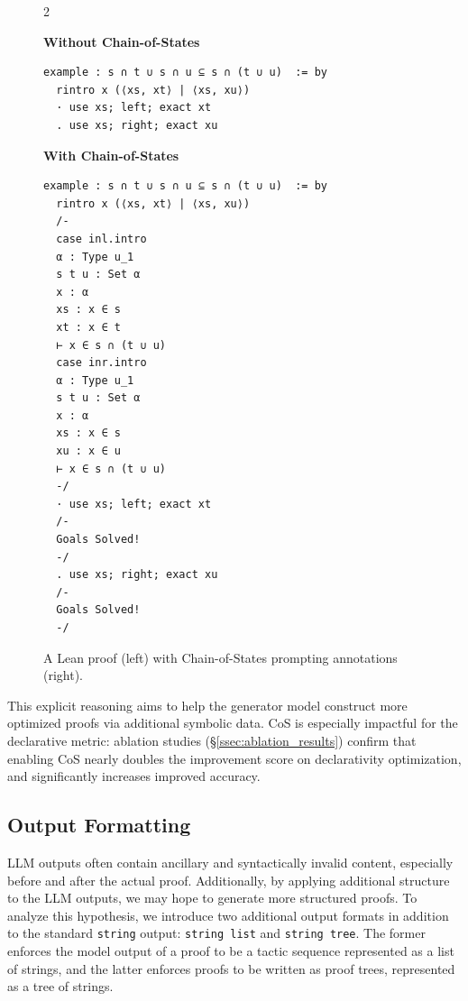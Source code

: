 \setlength{\columnsep}{0.2cm}
\begin{figure}[t!]

\begin{multicols}{2}

{
\textbf{Without Chain-of-States}
\begin{scriptsize}
\begin{lstlisting}[basicstyle=\scriptsize\ttfamily]
example : s ∩ t ∪ s ∩ u ⊆ s ∩ (t ∪ u)  := by
  rintro x (⟨xs, xt⟩ | ⟨xs, xu⟩)
  · use xs; left; exact xt
  . use xs; right; exact xu
\end{lstlisting}
\vspace{-0.8em}
\end{scriptsize}
}
\vfill\null
\columnbreak
{
\textbf{With Chain-of-States}
\begin{scriptsize}
\begin{lstlisting}[basicstyle=\scriptsize\ttfamily]
example : s ∩ t ∪ s ∩ u ⊆ s ∩ (t ∪ u)  := by
  rintro x (⟨xs, xt⟩ | ⟨xs, xu⟩)
  /-
  case inl.intro
  α : Type u_1
  s t u : Set α
  x : α
  xs : x ∈ s
  xt : x ∈ t
  ⊢ x ∈ s ∩ (t ∪ u)
  case inr.intro
  α : Type u_1
  s t u : Set α
  x : α
  xs : x ∈ s
  xu : x ∈ u
  ⊢ x ∈ s ∩ (t ∪ u)
  -/
  · use xs; left; exact xt
  /-
  Goals Solved!
  -/
  . use xs; right; exact xu
  /-
  Goals Solved!
  -/
\end{lstlisting}
\end{scriptsize}
}
\end{multicols}
\vspace{-2.5em}
\caption{A Lean proof (left) with Chain-of-States prompting annotations (right).}
\label{fig:cos}
\end{figure}

This explicit reasoning aims to help the generator model construct more optimized proofs via additional symbolic data. CoS is especially impactful for the declarative metric: ablation studies (\S\ref{ssec:ablation_results}) confirm that enabling CoS nearly doubles the improvement score on declarativity optimization, and significantly increases improved accuracy.

\subsection{Output Formatting}
\label{ssec:improver_output}

LLM outputs often contain ancillary and syntactically invalid content, especially before and after the actual proof. Additionally, by applying additional structure to the LLM outputs, we may hope to generate more structured proofs. To analyze this hypothesis, we introduce two additional output formats in addition to the standard \verb|string| output: \verb|string list| and \verb|string tree|. The former enforces the model output of a proof to be a tactic sequence represented as a list of strings, and the latter enforces proofs to be written as proof trees, represented as a tree of strings.

